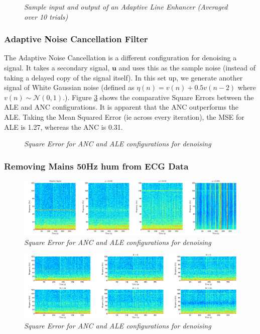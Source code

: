 \documentclass[./main.tex]{subfiles}
\begin{document}
\begin{figure}[h]
\centering 
\resizebox{\textwidth}{!}{}
\caption{\textit{Sample input and output of an Adaptive Line Enhancer (Averaged over 10 trials)}}
\label{fig:3_3_b_overview}
\end{figure}


\subsubsection{Adaptive Noise Cancellation Filter}

The Adaptive Noise Cancellation is a different configuration for denoising a signal. It takes a secondary signal, $\mathbf{u}$ and uses this as the sample noise (instead of taking a delayed copy of the signal itself). In this set up, we generate another signal of White Gaussian noise (defined as $ \eta(n) = v(n) + 0.5v(n-2) $ where $v(n) \sim \mathcal{N}(0,1) $.). Figure \ref{fig:3_3_c} shows the comparative Square Errors between the ALE and ANC configurations. It is apparent that the ANC outperforms the ALE. Taking the Mean Squared Error (ie across every iteration), the MSE for ALE is 1.27, whereas the ANC is 0.31.

\begin{figure}[h]
	\centering 
	\resizebox{\textwidth}{!}{}
	\caption{\textit{Square Error for ANC and ALE configurations for denoising}}
	\label{fig:3_3_c}
\end{figure}

\subsubsection{Removing Mains 50Hz hum from ECG Data}

\begin{figure}[h]
	\centering 
	\includegraphics[scale=0.4]{fig/3/3_3_d_mu.png}
	\caption{\textit{Square Error for ANC and ALE configurations for denoising}}
	\label{fig:3_3_c}
\end{figure}

\begin{figure}[h]
	\centering 
	\includegraphics[scale=0.4]{fig/3/3_3_d_order.png}
	\caption{\textit{Square Error for ANC and ALE configurations for denoising}}
	\label{fig:3_3_order}
\end{figure}
\end{document}

